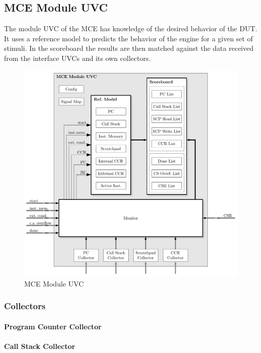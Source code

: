 \subsection{MCE Module UVC}

The module UVC of the MCE has knowledge of the desired behavior of the DUT.
It uses a reference model to predicts the behavior of the engine for a given set of stimuli.
In the scoreboard the results are then matched against the data received from the interface UVCs and its own collectors.

\begin{figure}[htb]
 \centering
 \includegraphics[width=1.0\textwidth,angle=0]{images/mce_module_uvc}
 \caption{MCE Module UVC}
\label{fig:module_uvc}
\end{figure}

\subsubsection{Collectors}

\paragraph{Program Counter Collector}

\paragraph{Call Stack Collector}

